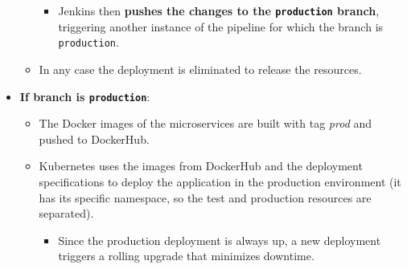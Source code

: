 \begin{itemize}
\begin{itemize}
\begin{itemize}
            \item Jenkins then \textbf{pushes the changes to the \texttt{production} branch}, triggering another instance of the pipeline for which the branch is \texttt{production}.
        \end{itemize}
        \item In any case the deployment is eliminated to release the resources.
    \end{itemize}
    \item \textbf{If branch is \texttt{production}}:
    \begin{itemize}
        \item The Docker images of the microservices are built with tag \textit{prod} and pushed to DockerHub.
        \item Kubernetes uses the images from DockerHub and the deployment specifications to deploy the application in the production environment (it has its specific namespace, so the test and production resources are separated).
        \begin{itemize}
            \item Since the production deployment is always up, a new deployment triggers a rolling upgrade that minimizes downtime. 
        \end{itemize}
    \end{itemize}
\end{itemize}